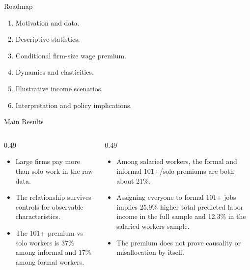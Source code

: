 

\begin{frame}{Roadmap}
  \begin{enumerate}
    \item Motivation and data.
    \item Descriptive statistics.
    \item Conditional firm-size wage premium.
    \item Dynamics and elasticities.
    \item Illustrative income scenarios.
    \item Interpretation and policy implications.
  \end{enumerate}
\end{frame}

\begin{frame}{Main Results}
  \begin{columns}[T,totalwidth=\textwidth]
    \begin{column}{0.49\textwidth}
      \vspace{0.25cm}
      \begin{itemize}
        \item Large firms pay more than solo work in the raw data.
        \item The relationship survives controls for observable characteristics.
        \item The 101+ premium vs solo workers is 37\% among informal and 17\% among formal workers.
      \end{itemize}
    \end{column}
    \begin{column}{0.49\textwidth}
      \vspace{0.25cm}
      \begin{itemize}
        \item Among salaried workers, the formal and informal 101+/solo premiums are both about 21\%.
        \item Assigning everyone to formal 101+ jobs implies 25.9\% higher total predicted labor income in the full sample and 12.3\% in the salaried workers sample.
        \item The premium does not prove causality or misallocation by itself.
      \end{itemize}
    \end{column}
  \end{columns}
\end{frame}

